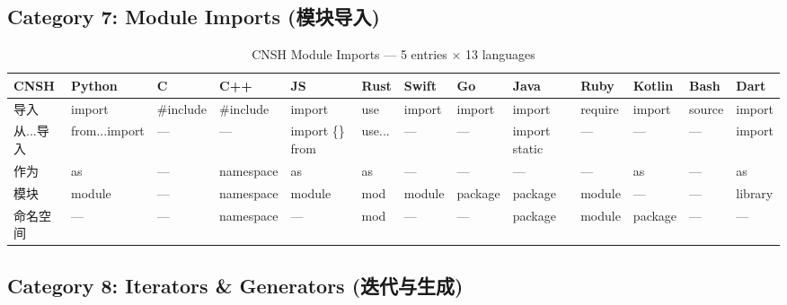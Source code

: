 \subsection{Category 7: Module Imports (模块导入)}
\label{app:ren-imports}

\begin{table}[h]
\centering
\caption{CNSH Module Imports — 5 entries × 13 languages}
\renewcommand{\arraystretch}{1.2}
\fontsize{8}{10}\selectfont
\begin{tabular}{lllllllllllll}
\toprule
\textbf{CNSH} & \textbf{Python} & \textbf{C} & \textbf{C++} & \textbf{JS} & \textbf{Rust} & \textbf{Swift} & \textbf{Go} & \textbf{Java} & \textbf{Ruby} & \textbf{Kotlin} & \textbf{Bash} & \textbf{Dart} \\
\midrule
导入 & import & \#include & \#include & import & use & import & import & import & require & import & source & import \\
从...导入 & from...import & — & — & import \{\} from & use... & — & — & import static & — & — & — & import \\
作为 & as & — & namespace & as & as & — & — & — & — & as & — & as \\
模块 & module & — & namespace & module & mod & module & package & package & module & — & — & library \\
命名空间 & — & — & namespace & — & mod & — & — & package & module & package & — & — \\
\bottomrule
\end{tabular}
\end{table}

\subsection{Category 8: Iterators \& Generators (迭代与生成)}
\label{app:ren-iterators}

